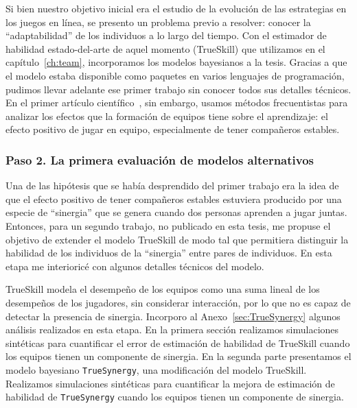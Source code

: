 \documentclass[a4paper,11pt]{book}
\theoremstyle{definition}
\begin{document}
Si bien nuestro objetivo inicial era el estudio de la evoluci\'on de las estrategias en los juegos en l\'inea, se presento un problema previo a resolver: conocer la ``adaptabilidad'' de los individuos a lo largo del tiempo.
%
Con el estimador de habilidad estado-del-arte de aquel momento (TrueSkill) que utilizamos en el cap\'itulo~\ref{ch:team}, incorporamos los modelos bayesianos a la tesis.
%
Gracias a que el modelo estaba disponible como paquetes en varios lenguajes de programaci\'on, pudimos llevar adelante ese primer trabajo sin conocer todos sus detalles t\'ecnicos.
%
En el primer art\'iculo cient\'ifico~\cite{Landfried2019}, sin embargo, usamos m\'etodos frecuentistas para analizar los efectos que la formaci\'on de equipos tiene sobre el aprendizaje: el efecto positivo de jugar en equipo, especialmente de tener compa\~neros estables.

\subsubsection{Paso 2. La primera evaluaci\'on de modelos alternativos}


Una de las hip\'otesis que se hab\'ia desprendido del primer trabajo era la idea de que el efecto positivo de tener compa\~neros estables estuviera producido por una especie de ``sinergia'' que se genera cuando dos personas aprenden a jugar juntas.
%
Entonces, para un segundo trabajo, no publicado en esta tesis, me propuse el objetivo de extender el modelo TrueSkill de modo tal que permitiera distinguir la habilidad de los individuos de la ``sinergia'' entre pares de individuos.
%
En esta etapa me interioric\'e con algunos detalles t\'ecnicos del modelo.


TrueSkill modela el desempe\~no de los equipos como una suma lineal de los desempe\~nos de los jugadores, sin considerar interacci\'on, por lo que no es capaz de detectar la presencia de sinergia.
%
Incorporo al Anexo~\ref{sec:TrueSynergy} algunos an\'alisis realizados en esta etapa.
%
En la primera secci\'on realizamos simulaciones sint\'eticas para cuantificar el error de estimaci\'on de habilidad de TrueSkill cuando los equipos tienen un componente de sinergia.
%
En la segunda parte presentamos el modelo bayesiano \texttt{TrueSynergy}, una modificaci\'on del modelo TrueSkill.
%
Realizamos simulaciones sint\'eticas para cuantificar la mejora de estimaci\'on de habilidad de \texttt{TrueSynergy} cuando los equipos tienen un componente de sinergia.
\end{document}
